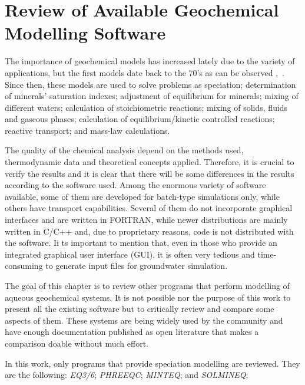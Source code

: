 

\chapter{Review of Available Geochemical Modelling Software}
\label{chapter:review}
The importance of geochemical models has increased lately due to the variety of applications, but the first models date back to the 70’s as can be observed \cite{Westall:76},~\cite{Wolery:79}. Since then, these models are used to solve problems as  speciation; determination of minerals' saturation indexes; adjustment of equilibrium for minerals; mixing of different waters; calculation of stoichiometric reactions; mixing of solids, fluids and gaseous phases; calculation of equilibrium/kinetic controlled reactions; reactive transport; and mass-law calculations.

The quality of the chemical analysis depend on the methods used, thermodynamic data and theoretical concepts applied. Therefore, it is crucial to verify the results and it is clear that there will be some differences in the results according to the software used. Among the enormous variety of software available, some of them are developed for batch-type simulations only, while others have transport capabilities. Several of them do not incorporate graphical interfaces and are written in FORTRAN, while newer distributions are mainly written in C/C++ and, due to proprietary reasons, code is not distributed with the software. Ii ts important to mention that, even in those who provide an integrated graphical user interface (GUI), it is often very tedious and time-consuming to generate input files for groundwater simulation.

The goal of this chapter is to review other programs that perform modelling of aqueous geochemical systems. It is not possible nor the purpose of this work to present all the existing software but to critically review and compare some aspects of them. These systems are being widely used by the community and have enough documentation published as open literature that makes a comparison doable without much effort. 

In this work, only programs that provide speciation modelling are reviewed. They are the following: \emph{EQ3/6}; \emph{PHREEQC}; \emph{MINTEQ}; and \emph{SOLMINEQ};

